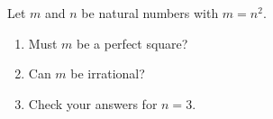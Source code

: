 Let $m$ and $n$ be natural numbers with $m=n^2$.
\begin{enumerate}
\item[(1)] Must $m$ be a perfect square?
\item[(2)] Can $m$ be irrational?
\item[(3)] Check your answers for $n=3$.
\end{enumerate}

